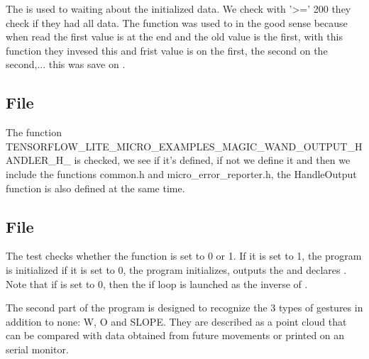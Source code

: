 The  is used to waiting about the initialized data.
We check with  '>=' 200 they check if they had all data. 
The function  was used to  in the good sense because when  read the first value is at the end and the old value is the first, with this function they invesed this and frist value is on the first, the second on the second,... this was save on .

\subsection{File }

The function  TENSORFLOW\_LITE\_MICRO\_EXAMPLES\_MAGIC\_WAND\_OUTPUT\_HANDLER\_H\_ is checked, we see if it's defined, if not we define it and then we include the functions common.h and micro\_error\_reporter.h, the HandleOutput function is also defined at the same time. 

\begin{center}
    		
    \label{Magic Wand Arduino  output handler}
\end{center}

\subsection{File }

The test checks whether the  function is set to 0 or 1. If it is set to 1, the program is initialized if it is set to 0, the program initializes, outputs the  and declares . Note that if  is set to 0, then the if loop is launched as the inverse of .  

The second part of the program is designed to recognize the 3 types of gestures in addition to none: W, O and SLOPE. They are described as a point cloud that can be compared with data obtained from future movements or printed on an serial monitor. 


\begin{center}
    		
    \label{Magic Wand Arduino output handler}
\end{center}



